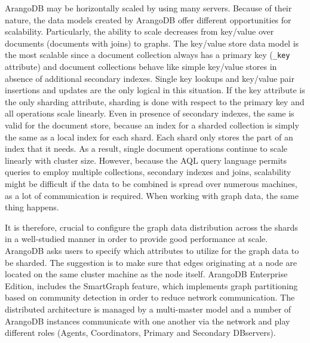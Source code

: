 ArangoDB may be horizontally scaled by using many servers.
Because of their nature, the data models created by ArangoDB offer different opportunities for scalability.
Particularly, the ability to scale decreases from key/value over documents (documents with joins) to graphs.
The key/value store data model is the most scalable since a document collection always has a primary key (\texttt{\_key} attribute) and document collections behave like simple key/value stores in absence of additional secondary indexes.
Single key lookups and key/value pair insertions and updates are the only logical in this situation.
If the key attribute is the only sharding attribute, sharding is done with respect to the primary key and all operations scale linearly.
Even in presence of secondary indexes, the same is valid for the document store, because an index for a sharded collection is simply the same as a local index for each shard.
Each shard only stores the part of an index that it needs.
As a result, single document operations continue to scale linearly with cluster size.
However, because the \acrshort{AQL} query language permits queries to employ multiple collections, secondary indexes and joins, scalability might be difficult if the data to be combined is spread over numerous machines, as a lot of communication is required.
When working with graph data, the same thing happens.

It is therefore, crucial to configure the graph data distribution across the shards in a well-studied manner in order to provide good performance at scale.
ArangoDB asks users to specify which attributes to utilize for the graph data to be sharded.
The suggestion is to make sure that edges originating at a node are located on the same cluster machine as the node itself.
ArangoDB Enterprise Edition, includes the SmartGraph feature, which implements graph partitioning based on community detection in order to reduce network communication.
The distributed architecture is managed by a multi-master model and a number of ArangoDB instances communicate with one another via the network and play different roles (Agents, Coordinators, Primary and Secondary DBservers).

